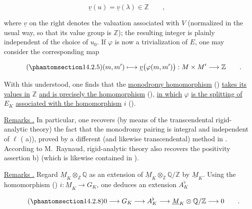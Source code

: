 \begin{equation*}
 \underline v(u)=\underline v(\lambda)\in\mathbb Z\qquad ,
\end{equation*}

\noindent
where $\underline v$ on the right denotes the valuation associated
with $V$ (normalized in the usual way, so that its value group is
$\mathbb Z$); the resulting integer is plainly independent of the
choice of $u_0$.  If $\varphi$ is now a trivialization of $E$, one may
consider the corresponding map

\begin{equation}\tag{\SGARefTarget{sga7.sga7i.eix.n14-2-5}{14.2.5}}
 (m,m')\longmapsto\underline v\bigl(\varphi(m,m')\bigr):
 M\times M'\longrightarrow\mathbb Z\qquad .
\end{equation}

\noindent
With this understood, one finds that the \underline{monodromy
homomorphism} () \underline{takes its values in} $\mathbb Z$
\underline{and is precisely the homomorphism} (), \underline{in
which} $\varphi$ \underline{is the splitting of} $E_K$
\underline{associated with the homomorphism} $i$ ().

\medskip
\noindent
\underline{Remarks .}  In particular, one recovers (by means of
the transcendental rigid-analytic theory) the fact that the monodromy
pairing is integral and independent of $\ell$ ( a)), proved by a
different (and likewise transcendental) method in .  According to
M.~Raynaud, rigid-analytic theory also recovers the positivity assertion
 b) (which is likewise contained in ).

\medskip
\noindent
\underline{Remarks .}  Regard
$\underline M_K\otimes_{\mathbb Z}\mathbb Q$ as an extension of
$\underline M_K\otimes_{\mathbb Z}\mathbb Q/\mathbb Z$ by
$\underline M_K$.  Using the homomorphism ()
$i:\underline M_K\longrightarrow G_K$, one deduces an extension
$A_K^{\flat}$

\begin{equation}\tag{\SGARefTarget{sga7.sga7i.eix.n14-2-8}{14.2.8}}
 0\longrightarrow G_K\longrightarrow A_K^{\flat}
 \longrightarrow\underline M_K\otimes\mathbb Q/\mathbb Z
 \longrightarrow0\qquad .
\end{equation}

